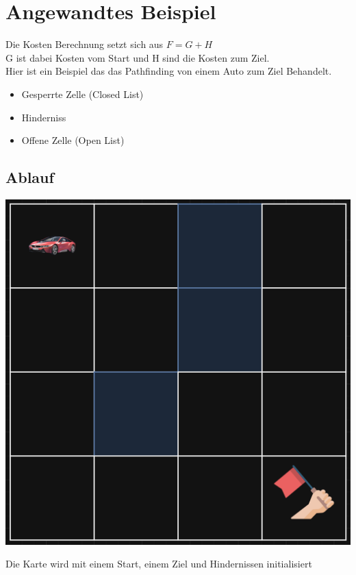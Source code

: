 \chapter{Angewandtes Beispiel}
{
Die Kosten Berechnung setzt sich aus \(F=G+H\) \\ G ist dabei Kosten vom Start und H sind die Kosten zum Ziel. \\
Hier ist ein Beispiel das das Pathfinding von einem Auto zum Ziel Behandelt.
\begin{itemize}
    \item \color{violet} Gesperrte Zelle (Closed List)\color{black}
    \item \color{blue} Hinderniss\color{black}
    \item \color{green} Offene Zelle (Open List)
\end{itemize} 
}
\section{Ablauf}
{
\begin{minipage}{0.4\linewidth}
  \includegraphics[scale=.125]{Cars/img1.png}
\end{minipage}
\begin{minipage}{0.6\linewidth}
Die Karte wird mit einem Start, einem Ziel und Hindernissen initialisiert
\end{minipage}
}
